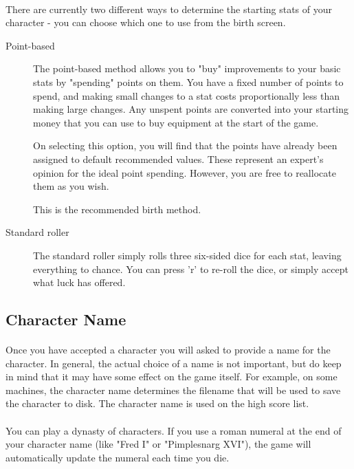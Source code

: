 \paragraph{}There are currently two different ways to determine the starting stats of
your character - you can choose which one to use from the birth screen.
\begin{description}
\item[Point-based] The point-based method allows you to "buy"
    improvements to your basic stats by "spending" points on them. You
    have a fixed number of points to spend, and making small changes to
    a stat costs proportionally less than making large changes.  Any
    unspent points are converted into your starting money that you can
    use to buy equipment at the start of the game.

    On selecting this option, you will find that the points have
    already been assigned to default recommended values. These
    represent an expert's opinion for the ideal point spending.
    However, you are free to reallocate them as you wish.

    This is the recommended birth method.

\item[Standard roller] The standard roller simply rolls three six-sided dice for each
    stat, leaving everything to chance. You can press 'r' to re-roll
    the dice, or simply accept what luck has offered.
\end{description}

\subsection{Character Name}
\paragraph{}Once you have accepted a character you will asked to provide
a name for the character. In general, the actual choice of a name is not
important, but do keep in mind that it may have some effect on the game
itself. For example, on some machines, the character name determines the
filename that will be used to save the character to disk. The character
name is used on the high score list.

\paragraph{}You can play a dynasty of characters. If you use a roman
numeral at the end of your character name (like "Fred I" or "Pimplesnarg
XVI"), the game will automatically update the numeral each time you
die.


